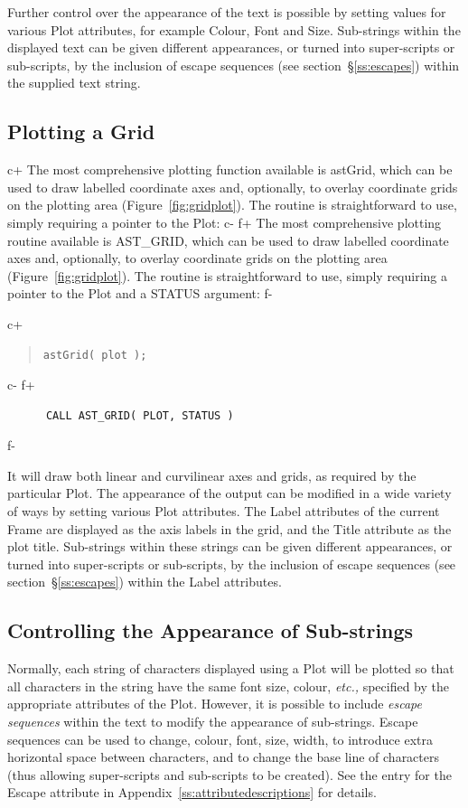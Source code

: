 \documentclass[twoside,11pt]{article}
\newcommand{\appref}[1]{Appendix~\ref{#1}}
\newcommand{\secref}[1]{\S\ref{#1}}
\newcommand{\appref}[1]{\ref{#1}}
\newcommand{\secref}[1]{\ref{#1}}
\begin{document}
Further control over the appearance of the text is possible by setting
values for various Plot attributes, for example Colour, Font and Size.
Sub-strings within the displayed text can be given different appearances,
or turned into super-scripts or sub-scripts, by the inclusion of escape 
sequences (see section~\secref{ss:escapes}) within the supplied text string.

\subsection{\label{ss:plottingagrid}Plotting a Grid}

c+
The most comprehensive plotting function available is astGrid, which
can be used to draw labelled coordinate axes and, optionally, to
overlay coordinate grids on the plotting area
(Figure~\ref{fig:gridplot}). The routine is straightforward to use,
simply requiring a pointer to the Plot:
c-
f+
The most comprehensive plotting routine available is AST\_GRID, which
can be used to draw labelled coordinate axes and, optionally, to
overlay coordinate grids on the plotting area
(Figure~\ref{fig:gridplot}). The routine is straightforward to use,
simply requiring a pointer to the Plot and a STATUS argument:
f-

c+
\begin{quote}
\small
\begin{verbatim}
astGrid( plot );
\end{verbatim}
\normalsize
\end{quote}
c-
f+
\small
\begin{verbatim}
      CALL AST_GRID( PLOT, STATUS )
\end{verbatim}
\normalsize
f-

It will draw both linear and curvilinear axes and grids, as required
by the particular Plot. The appearance of the output can be modified
in a wide variety of ways by setting various Plot attributes.
The Label attributes of the current Frame are displayed as the axis 
labels in the grid, and the Title attribute as the plot title. Sub-strings 
within these strings can be given different appearances, or turned into
super-scripts or sub-scripts, by the inclusion of escape sequences (see 
section~\secref{ss:escapes}) within the Label attributes.

\subsection{\label{ss:escapes}Controlling the Appearance of Sub-strings}
Normally, each string of characters displayed using a Plot will be
plotted so that all characters in the string have the same font size,
colour, {\em{etc.,}} specified by the appropriate attributes of the
Plot. However, it is possible to include \emph{escape sequences} within
the text to modify the appearance of sub-strings. Escape sequences can be
used to change, colour, font, size, width, to introduce extra horizontal
space between characters, and to change the base line of characters (thus
allowing super-scripts and sub-scripts to be created). See the entry for
the Escape attribute in \appref{ss:attributedescriptions} for details.
\end{document}
